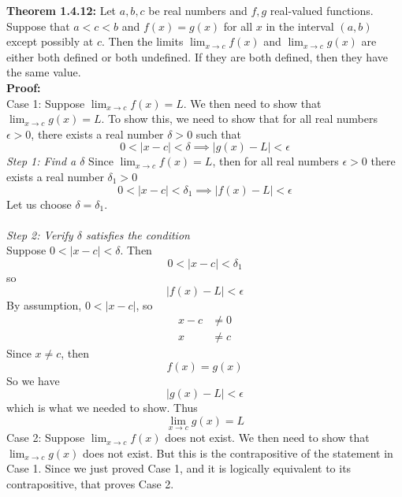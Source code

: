 \documentclass{article}
\begin{document}
	\textbf{Theorem 1.4.12:} Let $a, b, c$ be real numbers and $f, g$ real-valued functions. Suppose that $a < c < b$ and $f(x) = g(x)$ for all $x$ in the interval $(a, b)$ except possibly at $c$. Then the limits $\lim_{x \to c}{f(x)}$ and $\lim_{x \to c}{g(x)}$ are either both defined or both undefined. If they are both defined, then they have the same value. \\
	\textbf{Proof:} \\
	Case 1: Suppose $\lim_{x \to c}{f(x)} = L$. We then need to show that $\lim_{x \to c}{g(x)} = L$.
	To show this, we need to show that for all real numbers $\epsilon > 0$, there exists a real number $\delta > 0$ such that
	$$0 < |x - c| < \delta \implies |g(x) - L| < \epsilon$$
	\textit{Step 1: Find a $\delta$}
	Since $\lim_{x \to c}{f(x)} = L$, then for all real numbers $\epsilon > 0$ there exists a real number $\delta_1 > 0$
	$$0 < |x - c| < \delta_1 \implies |f(x) - L| < \epsilon$$
	Let us choose $\delta = \delta_1$. \\\\
	\textit{Step 2: Verify $\delta$ satisfies the condition} \\
	Suppose $0 < |x - c| < \delta$. Then
	$$0 < |x - c| < \delta_1$$
	so
	$$|f(x) - L| < \epsilon$$
	By assumption, $0 < |x - c|$, so
    \begin{align*}
    	x - c &\neq 0 \\
    	x &\neq c
    \end{align*}
    Since $x \neq c$, then
    $$f(x) = g(x)$$
    So we have
    $$|g(x) - L| < \epsilon$$
    which is what we needed to show. Thus
    $$\lim_{x \to c}{g(x)} = L$$
    Case 2: Suppose $\lim_{x \to c}{f(x)}$ does not exist. We then need to show that $\lim_{x \to c}{g(x)}$ does not exist. But this is the contrapositive of the statement in Case 1. Since we just proved Case 1, and it is logically equivalent to its contrapositive, that proves Case 2.
\end{document}
